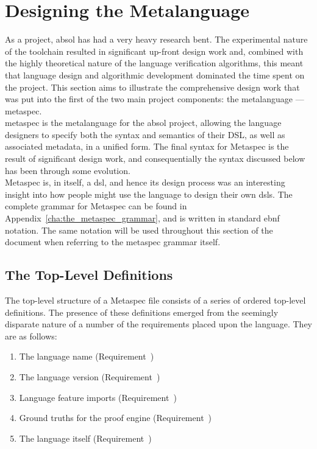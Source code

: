 \chapter{Designing the Metalanguage} %
\label{cha:designing_the_metalanguage}
As a project, \gls{absol} has had a very heavy research bent. 
The experimental nature of the toolchain resulted in significant up-front design work and, combined with the highly theoretical nature of the language verification algorithms, this meant that language design and algorithmic development dominated the time spent on the project.
This section aims to illustrate the comprehensive design work that was put into the first of the two main project components: the metalanguage --- \gls{metaspec}. \\

\gls{metaspec} is the metalanguage for the \gls{absol} project, allowing the language designers to specify both the syntax and semantics of their DSL, as well as associated metadata, in a unified form. 
The final syntax for Metaspec is the result of significant design work, and consequentially the syntax discussed below has been through some evolution. \\

Metaspec is, in itself, a \gls{dsl}, and hence its design process was an interesting insight into how people might use the language to design their own \glspl{dsl}. 
The complete grammar for Metaspec can be found in Appendix~\ref{cha:the_metaspec_grammar}, and is written in standard \gls{ebnf} notation. 
The same notation will be used throughout this section of the document when referring to the metaspec grammar itself.

\section{The Top-Level Definitions} %
\label{sec:the_top_level_definitions}
The top-level structure of a Metaspec file consists of a series of ordered top-level definitions.
The presence of these definitions emerged from the seemingly disparate nature of a number of the requirements placed upon the language.
They are as follows:
\begin{enumerate}
    \item The language name (Requirement~)
    \item The language version (Requirement~)
    \item Language feature imports (Requirement~)
    \item Ground truths for the proof engine (Requirement~)
    \item The language itself (Requirement~)
\end{enumerate}


